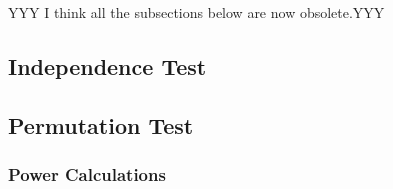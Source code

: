 \documentclass[11pt]{article}
\begin{document}
YYY I think all the subsections below are now obsolete.YYY

\subsection{Independence Test}


\subsection{Permutation Test}




\subsubsection{Power Calculations}


\end{document}
